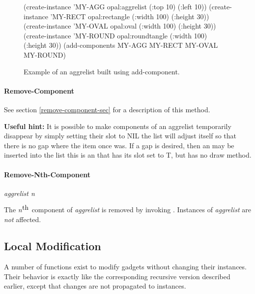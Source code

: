 \begin{figure}
\begin{programexample}
(create-instance 'MY-AGG opal:aggrelist (:top 10) (:left 10))
(create-instance 'MY-RECT opal:rectangle
   (:width 100) (:height 30))
(create-instance 'MY-OVAL opal:oval
   (:width 100) (:height 30))
(create-instance 'MY-ROUND opal:roundtangle
   (:width 100) (:height 30))
(add-components MY-AGG MY-RECT MY-OVAL MY-ROUND)

\end{programexample}
\caption{Example of an aggrelist built using add-component.}
\end{figure}


\paragraph{Remove-Component}

See section \ref{remove-component-sec} for a description of this method.

{\bf Useful hint:} It is possible to make components of an aggrelist
temporarily disappear by simply
setting their  slot to NIL  the list will adjust itself so
that there is no gap where the item once was.  If a gap is desired, then an
 may be inserted into the list  this is an
 that has its  slot set to T, but has no
draw method.


\paragraph{Remove-Nth-Component}

\vspace{1 line}
 {\it aggrelist n}\value{method}

The {\it n}$^{\hbox{th}}$ component of {\it aggrelist} is removed by
invoking .  Instances of {\it aggrelist}
are {\it not} affected.


\subsection{Local Modification}
A number of functions exist to modify gadgets without changing their
instances.  Their behavior is exactly like the corresponding
recursive version described earlier, except that changes are
not propagated to instances.

